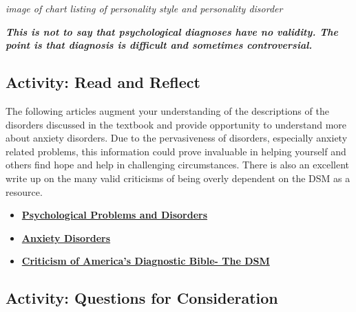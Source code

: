 \documentclass[
]{book}
\providecommand{\tightlist}{%
  \setlength{\itemsep}{0pt}\setlength{\parskip}{0pt}}
\begin{document}
\emph{image of chart listing of personality style and personality disorder}

\textbf{\emph{This is not to say that psychological diagnoses have no validity. The point is that diagnosis is difficult and sometimes controversial.}}

\hypertarget{activity-read-and-reflect-16}{%
\subsection*{Activity: Read and Reflect}\label{activity-read-and-reflect-16}}

\begin{reflect}
The following articles augment your understanding of the descriptions of the disorders discussed in the textbook and provide opportunity to understand more about anxiety disorders. Due to the pervasiveness of disorders, especially anxiety related problems, this information could prove invaluable in helping yourself and others find hope and help in challenging circumstances. There is also an excellent write up on the many valid criticisms of being overly dependent on the DSM as a resource.

\begin{itemize}
\tightlist
\item
  \href{https://psychologyinfo.com/}{\textbf{Psychological Problems and Disorders}}\\
\item
  \href{https://psychologyinfo.com/}{\textbf{Anxiety Disorders}}\\
\item
  \href{https://www.pchtreatment.com/dsm-5-issues/}{\textbf{Criticism of America's Diagnostic Bible- The DSM}}
\end{itemize}
\end{reflect}

\hypertarget{activity-questions-for-consideration-15}{%
\subsection*{Activity: Questions for Consideration}\label{activity-questions-for-consideration-15}}
\end{document}
